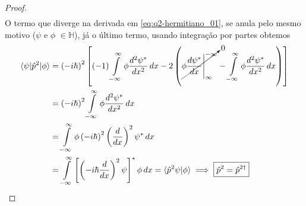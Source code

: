 \begin{prob}
\begin{proof}
\begin{align}
			 \end{align}
			 O termo que diverge na derivada em \eqref{eq:q2-hermitiano_01}, se anula pelo mesmo motivo ($\psi$ e $\phi$ $\in\mathbb{H}$), já o último termo, usando integração por partes obtemos
			 \begin{align}
				 \begin{split}
					 \langle{\psi}|\hat{p}^{2}|{\phi}\rangle &= \left(-i \hbar{}\right)^{2}\left[(-1)\int\limits_{-\infty}^{\infty} \phi \frac{d^{2} \psi^{*}}{dx^{2}}\,d{x}-2\left(\cancelto{0}{\phi \frac{d \psi^{*}}{dx}\Bigg|^{-\infty}_{\infty}}-\int\limits_{-\infty}^{\infty} \phi \frac{d^{2} \psi^{*}}{dx^{2}}\,d{x}\right)\right]\\
																									 &=  \left(-i \hbar{}\right)^{2}\int\limits_{-\infty}^{\infty} \phi \frac{d^{2} \psi^{*}}{dx^{2}}\,d{x}\\
																									 &= \int\limits_{-\infty}^{\infty} \phi\left(-i \hbar{}\right)^{2}\left(\frac{d}{dx}\right)^{2} \psi^{*}\,d{x}\\
																									 &= \int\limits_{-\infty}^{\infty}\left[\left(-i \hbar{}\frac{d}{dx}\right)^{2} \psi\right]^{*}\phi\,d{x}=\langle{\hat{p}^{2}} \psi|{\phi}\rangle\implies \boxed{\hat{p}^{2}=\hat{p}^{2\dag}}
				 \end{split}
			 \end{align}

		 \end{proof}
	 \end{prob}


